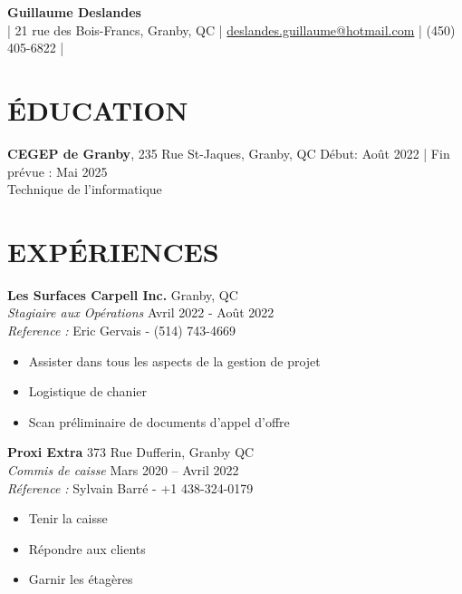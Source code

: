 \documentclass[a4paper,9pt]{extarticle}
\begin{document}
\pagestyle{empty}

\begin{center}
\textbf{\Large Guillaume Deslandes}\\[2pt] %
| 21 rue des Bois-Francs, Granby, QC | \href{mailto:deslandes.guillaume@hotmail.com}{deslandes.guillaume@hotmail.com} | (450) 405-6822 | 
\end{center}

\section*{ÉDUCATION}
\noindent
\textbf{CEGEP de Granby}, 235 Rue St-Jaques, Granby, QC \hfill Début: Août 2022 | Fin prévue :  Mai 2025\\ %
Technique de l'informatique \hfill \\ %


\section*{EXPÉRIENCES}
\noindent
\textbf{Les Surfaces Carpell Inc.} \hfill Granby, QC\\ %
\textit{Stagiaire aux Opérations} \hfill Avril 2022 - Août 2022 \\ %
\textit{Reference : } \hfill Eric Gervais - (514) 743-4669

\begin{itemize}
    \item Assister dans tous les aspects de la gestion de projet
    \item Logistique de chanier
    \item Scan préliminaire de documents d'appel d'offre
\end{itemize}

\noindent
\textbf{Proxi Extra} \hfill 373 Rue Dufferin, Granby QC\\ %
\textit{Commis de caisse} \hfill Mars 2020 – Avril 2022 \\%
\textit{Réference : } \hfill Sylvain Barré - +1 438-324-0179 %

\begin{itemize}
    \item Tenir la caisse
    \item Répondre aux clients
    \item Garnir les étagères
\end{itemize}
\end{document}
